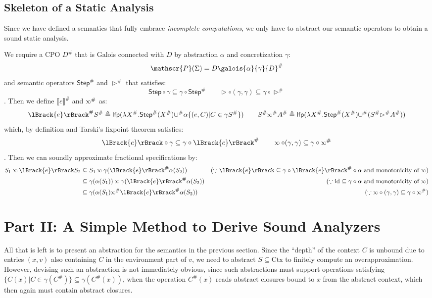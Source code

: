 \documentclass{article}
\theoremstyle{definition}
\newcommand*{\pset}{\mathscr{P}}
\newcommand*{\Abs}[1]{{#1}^{\#}}
\newcommand*{\Ctx}{\text{Ctx}}
\newcommand*{\lfp}{\mathsf{lfp}}
\newcommand*{\Step}{\mathsf{Step}}
\newcommand*{\semlink}{\mathbin{\rotatebox[origin=c]{180}{$\propto$}}}
\newcommand*{\sembracket}[1]{\lBrack{#1}\rBrack}
\begin{document}
\subsection{Skeleton of a Static Analysis}
Since we have defined a semantics that fully embrace \emph{incomplete computations}, we only have to abstract our semantic operators to obtain a sound static analysis.

We require a CPO $\Abs{D}$ that is Galois connected with $D$ by abstraction $\alpha$ and concretization $\gamma$:
\[\pset(\Sigma)=D\galois{\alpha}{\gamma}\Abs{D}\]
and semantic operators $\Abs\Step$ and $\Abs\rhd$ that satisfies:
\[\Step\circ\gamma\subseteq\gamma\circ\Abs\Step\qquad\rhd\circ(\gamma,\gamma)\subseteq\gamma\circ\Abs\rhd\]
. Then we define $\Abs{\sembracket{e}}$ and $\Abs\semlink$ as:
\[
  \Abs{\sembracket{e}}\Abs{S}\triangleq\lfp(\lambda\Abs{X}.\Abs\Step(\Abs{X})\Abs\cup\alpha\{(e,C)|C\in\gamma\Abs{S}\})\qquad
  \Abs{S}\Abs\semlink\Abs{A}\triangleq\lfp(\lambda\Abs{X}.\Abs\Step(\Abs{X})\Abs\cup(\Abs{S}\Abs\rhd\Abs{A}))
\]
which, by definition and Tarski's fixpoint theorem satisfies:
\[\sembracket{e}\circ\gamma\subseteq\gamma\circ\Abs{\sembracket{e}}\qquad\semlink\circ(\gamma,\gamma)\subseteq\gamma\circ\Abs\semlink\]
. Then we can soundly approximate fractional specifications by:
\begin{align*}
  S_1\semlink\sembracket{e}S_2 & \subseteq S_1\semlink\gamma(\Abs{\sembracket{e}}\alpha(S_2))                 & (\because\sembracket{e}\subseteq\gamma\circ\Abs{\sembracket{e}}\circ\alpha\text{ and monotonicity of }\semlink) \\
                               & \subseteq \gamma(\alpha(S_1))\semlink\gamma(\Abs{\sembracket{e}}\alpha(S_2)) & (\because\text{id}\subseteq\gamma\circ\alpha\text{ and monotonicity of }\semlink)                               \\
                               & \subseteq\gamma(\alpha(S_1)\Abs\semlink\Abs{\sembracket{e}}\alpha(S_2))      & (\because\semlink\circ(\gamma,\gamma)\subseteq\gamma\circ\Abs\semlink)
\end{align*}

\section{Part II: A Simple Method to Derive Sound Analyzers}

All that is left is to present an abstraction for the semantics in the previous section.
Since the ``depth'' of the context $C$ is unbound due to entries $(x,v)$ also containing $C$ in the environment part of $v$, we need to abstract $S\subseteq\Ctx$ to finitely compute an overapproximation.
However, devising such an abstraction is not immediately obvious, since such abstractions must support operations satisfying $\{C(x)|C\in\gamma(\Abs{C})\}\subseteq\gamma(\Abs{C}(x))$, when the operation $\Abs{C}(x)$ reads abstract closures bound to $x$ from the abstract context, which then again must contain abstract closures.
\end{document}
